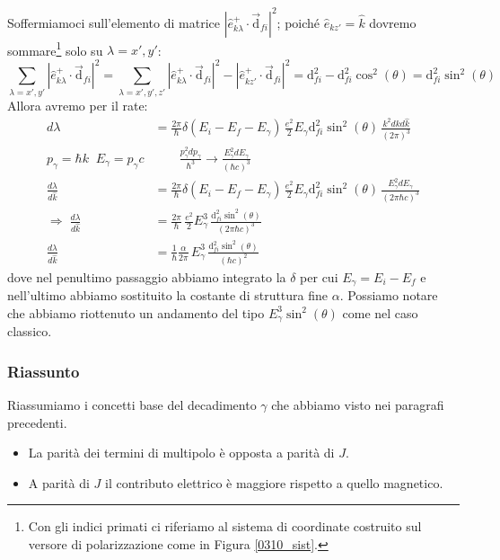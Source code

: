 \newline
\noindent Soffermiamoci sull'elemento di matrice $|\hat{e}^+_{k\lambda}\cdot \vec{\mathrm{d}}_{fi}|^2$; poiché $\hat{e}_{kz'} = \hat{k}$ dovremo sommare\footnote{Con gli indici primati ci riferiamo al sistema di coordinate costruito sul versore di polarizzazione come in Figura \ref{0310_sist}.} solo su $\lambda = x',y'$:
$$\sum_{\lambda = x',y'}|\hat{e}^+_{k\lambda}\cdot \vec{\mathrm{d}}_{fi}|^2 = \sum_{\lambda=x',y',z'} |\hat{e}^+_{k\lambda}\cdot \vec{\mathrm{d}}_{fi}|^2 - |\hat{e}^+_{kz'}\cdot \vec{\mathrm{d}}_{fi}|^2 = \mathrm{d}_{fi}^2 -\mathrm{d}_{fi}^2\cos^2{(\theta)} = \mathrm{d}_{fi}^2 \sin^2{(\theta)} $$
Allora avremo per il rate:
\begin{displaymath}
\begin{aligned}
d\lambda &= \frac{2\pi}{\hbar} \delta(E_i-E_f-E_\gamma) \,\frac{e^2}{2}E_\gamma \mathrm{d}_{fi}^2 \sin^2(\theta) \,  \frac{k^2dkd\hat{k}}{(2\pi)^3} \\
%
p_\gamma = \hbar k \;\; E_\gamma = p_\gamma c &\qquad\frac{p^2_\gamma dp_\gamma}{\hbar^3} \to \frac{E_\gamma^2 dE_\gamma}{(\hbar c)^3}\\
%
\frac{d\lambda}{d\hat{k}} &= \frac{2\pi}{\hbar} \delta(E_i-E_f-E_\gamma) \,\frac{e^2}{2}E_\gamma \mathrm{d}_{fi}^2 \sin^2(\theta) \, \frac{E_\gamma^2 dE_\gamma}{(2\pi\hbar c)^3} \\
%
\Rightarrow \; \frac{d\lambda}{d\hat{k}} &= \frac{2\pi}{\hbar} \,\frac{e^2}{2}E_\gamma^3 \, \frac{\mathrm{d}_{fi}^2 \sin^2(\theta)}{(2\pi \hbar c)^3} \\
%
\frac{d\lambda}{d\hat{k}} &= \frac{1}{\hbar} \frac{\alpha}{2\pi}\,E_\gamma^3 \, \frac{\mathrm{d}_{fi}^2 \sin^2(\theta)}{( \hbar c)^2}
\end{aligned}
\end{displaymath}
dove nel penultimo passaggio abbiamo integrato la $\delta$ per cui $E_\gamma = E_i - E_f$ e nell'ultimo abbiamo sostituito la costante di struttura fine $\alpha$. Possiamo notare che abbiamo riottenuto un andamento del tipo $E^3_\gamma \sin^2(\theta)$ come nel caso classico.

\subsubsection{Riassunto}
Riassumiamo i concetti base del decadimento $\gamma$ che abbiamo visto nei paragrafi precedenti.
\begin{itemize}
    \item La parità dei termini di multipolo è opposta a parità di $J$.
    \item A parità di $J$ il contributo elettrico è maggiore rispetto a quello magnetico.
\end{itemize}

